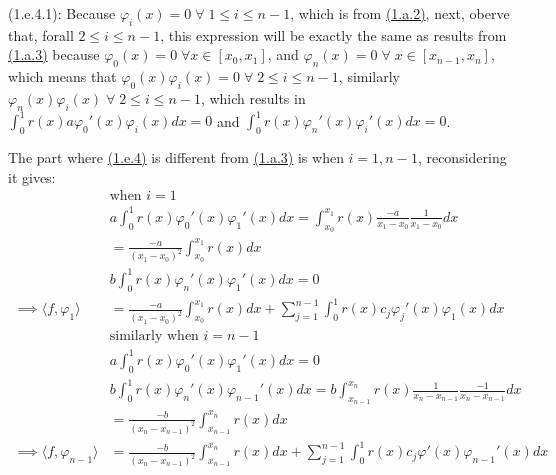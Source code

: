 \documentclass[]{article}
\begin{document}
        (1.e.4.1): Because $\varphi_i(x) = 0\; \forall\; 1 \le i \le n - 1$, which is from \hyperref[eqn:1.a.2]{(1.a.2)}, next, oberve that, forall $2 \le i \le n - 1$, this expression will be exactly the same as results from \hyperref[eqn:1.a.3]{(1.a.3)} because $\varphi_0(x) = 0 \;\forall x \in [x_0, x_1]$, and $\varphi_{n}(x) = 0 \;\forall\; x\in [x_{n - 1}, x_n]$, which means that $\varphi_0(x)\varphi_i(x) = 0\; \forall\; 2 \le i \le n - 1$, similarly $\varphi_n(x)\varphi_i(x)\; \forall\; 2 \le i \le n - 1$, which results in $\int_{0}^{1} r(x)a\varphi_0'(x)\varphi_i(x)dx = 0$ and $\int_{0}^{1}r(x)\varphi_n'(x)\varphi_i'(x) dx = 0$. 
        \par
        The part where \hyperref[eqn:1.e.4]{(1.e.4)} is different from \hyperref[eqn:1.a.3]{(1.a.3)} is when $i = 1, n - 1$, reconsidering it gives: 
        \begin{align*}\tag{1.e.5}\label{eqn:1.e.5}
            &\text{when } i = 1 
            \\
            & a\int_{0}^{1} 
                r(x)\varphi_0'(x)\varphi_1'(x)
            dx = \int_{x_0}^{x_1} 
                r(x)\frac{-a}{x_1 - x_0}\frac{1}{x_1 - x_0}
            dx
            \\
            &= \frac{-a}{(x_1 - x_0)^2}\int_{x_0}^{x_1} r(x)dx
            \\
            &
            b\int_{0}^{1} 
                r(x)\varphi_n'(x)\varphi_1'(x)
            dx = 0
            \\
            \implies
            \langle f, \varphi_1\rangle
            &= 
            \frac{-a}{(x_1 - x_0)^2}\int_{x_0}^{x_1} 
                r(x)
            dx + 
            \sum_{j = 1}^{n-1}
            \int_{0}^{1} 
                r(x)c_j\varphi_j'(x)\varphi_1(x)
            dx
            \\
            & \text{similarly when }i = n - 1
            \\
            & 
            a\int_{0}^{1} 
                r(x)\varphi_0'(x)\varphi_1'(x)
            dx = 0
            \\
            &
            b\int_{0}^{1} 
                r(x)\varphi_n'(x)\varphi_{n - 1}'(x)
            dx 
            =
            b\int_{x_{n - 1}}^{x_n} 
                r(x)\frac{1}{x_n - x_{n - 1}}\frac{-1}{x_n - x_{n - 1}}
            dx
            \\
            & = 
            \frac{-b}{(x_n - x_{n - 1})^2}\int_{x_{n - 1}}^{x_n} 
                r(x)
            dx
            \\
            \implies
            \langle f, \varphi_{n - 1}\rangle
            &= 
            \frac{-b}{(x_n - x_{n - 1})^2}\int_{x_{n - 1}}^{x_n} 
                r(x)
            dx + 
            \sum_{j = 1}^{n - 1}
            \int_{0}^{1} 
                r(x)c_j\varphi'(x)\varphi_{n - 1}'(x)
            dx
        \end{align*}
\end{document}
